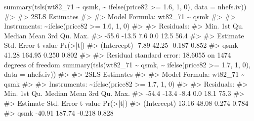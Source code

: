 \documentclass[
  10pt,
  a4paper,
]{book}
\newenvironment{Shaded}{\begin{snugshade}}{\end{snugshade}}
\newcommand{\AttributeTok}[1]{\textcolor[rgb]{0.40,0.45,0.13}{#1}}
\newcommand{\CommentTok}[1]{\textcolor[rgb]{0.37,0.37,0.37}{#1}}
\newcommand{\DecValTok}[1]{\textcolor[rgb]{0.68,0.00,0.00}{#1}}
\newcommand{\FloatTok}[1]{\textcolor[rgb]{0.68,0.00,0.00}{#1}}
\newcommand{\FunctionTok}[1]{\textcolor[rgb]{0.28,0.35,0.67}{#1}}
\newcommand{\NormalTok}[1]{\textcolor[rgb]{0.00,0.46,0.62}{#1}}
\newcommand{\SpecialCharTok}[1]{\textcolor[rgb]{0.37,0.37,0.37}{#1}}
\begin{document}
\begin{Shaded}
\begin{Highlighting}[]
\FunctionTok{summary}\NormalTok{(}\FunctionTok{tsls}\NormalTok{(wt82\_71 }\SpecialCharTok{\textasciitilde{}}\NormalTok{ qsmk, }\SpecialCharTok{\textasciitilde{}} \FunctionTok{ifelse}\NormalTok{(price82 }\SpecialCharTok{\textgreater{}=} \FloatTok{1.6}\NormalTok{, }\DecValTok{1}\NormalTok{, }\DecValTok{0}\NormalTok{), }\AttributeTok{data =}\NormalTok{ nhefs.iv))}
\CommentTok{\#\textgreater{} }
\CommentTok{\#\textgreater{}  2SLS Estimates}
\CommentTok{\#\textgreater{} }
\CommentTok{\#\textgreater{} Model Formula: wt82\_71 \textasciitilde{} qsmk}
\CommentTok{\#\textgreater{} }
\CommentTok{\#\textgreater{} Instruments: \textasciitilde{}ifelse(price82 \textgreater{}= 1.6, 1, 0)}
\CommentTok{\#\textgreater{} }
\CommentTok{\#\textgreater{} Residuals:}
\CommentTok{\#\textgreater{}    Min. 1st Qu.  Median    Mean 3rd Qu.    Max. }
\CommentTok{\#\textgreater{}   {-}55.6   {-}13.5     7.6     0.0    12.5    56.4 }
\CommentTok{\#\textgreater{} }
\CommentTok{\#\textgreater{}             Estimate Std. Error t value Pr(\textgreater{}|t|)}
\CommentTok{\#\textgreater{} (Intercept)    {-}7.89      42.25  {-}0.187    0.852}
\CommentTok{\#\textgreater{} qsmk           41.28     164.95   0.250    0.802}
\CommentTok{\#\textgreater{} }
\CommentTok{\#\textgreater{} Residual standard error: 18.6055 on 1474 degrees of freedom}
\FunctionTok{summary}\NormalTok{(}\FunctionTok{tsls}\NormalTok{(wt82\_71 }\SpecialCharTok{\textasciitilde{}}\NormalTok{ qsmk, }\SpecialCharTok{\textasciitilde{}} \FunctionTok{ifelse}\NormalTok{(price82 }\SpecialCharTok{\textgreater{}=} \FloatTok{1.7}\NormalTok{, }\DecValTok{1}\NormalTok{, }\DecValTok{0}\NormalTok{), }\AttributeTok{data =}\NormalTok{ nhefs.iv))}
\CommentTok{\#\textgreater{} }
\CommentTok{\#\textgreater{}  2SLS Estimates}
\CommentTok{\#\textgreater{} }
\CommentTok{\#\textgreater{} Model Formula: wt82\_71 \textasciitilde{} qsmk}
\CommentTok{\#\textgreater{} }
\CommentTok{\#\textgreater{} Instruments: \textasciitilde{}ifelse(price82 \textgreater{}= 1.7, 1, 0)}
\CommentTok{\#\textgreater{} }
\CommentTok{\#\textgreater{} Residuals:}
\CommentTok{\#\textgreater{}    Min. 1st Qu.  Median    Mean 3rd Qu.    Max. }
\CommentTok{\#\textgreater{}   {-}54.4   {-}13.4    {-}8.4     0.0    18.1    75.3 }
\CommentTok{\#\textgreater{} }
\CommentTok{\#\textgreater{}             Estimate Std. Error t value Pr(\textgreater{}|t|)}
\CommentTok{\#\textgreater{} (Intercept)    13.16      48.08   0.274    0.784}
\CommentTok{\#\textgreater{} qsmk          {-}40.91     187.74  {-}0.218    0.828}

\end{Highlighting}
\end{Shaded}
\end{document}

